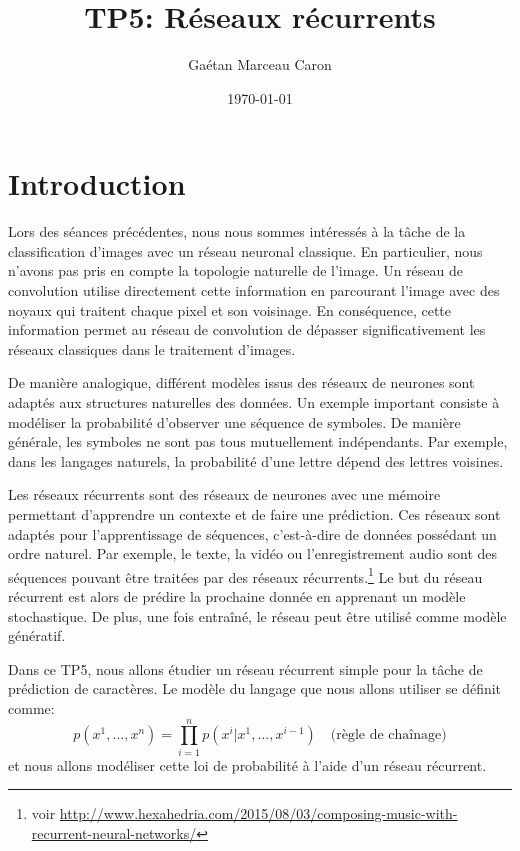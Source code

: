 \documentclass{article}
\title{TP5: Réseaux récurrents}
\author{Gaétan Marceau Caron}
\date{\today}
\begin{document}
\maketitle

\section{Introduction}
Lors des séances précédentes, nous nous sommes intéressés à la tâche de la classification d'images avec un réseau neuronal classique.
En particulier, nous n'avons pas pris en compte la topologie naturelle de l'image.
Un réseau de convolution utilise directement cette information en parcourant l'image avec des noyaux qui traitent chaque pixel et son voisinage.
En conséquence, cette information permet au réseau de convolution de dépasser significativement les réseaux classiques dans le traitement d'images.

De manière analogique, différent modèles issus des réseaux de neurones sont adaptés aux structures naturelles des données.
Un exemple important consiste à modéliser la probabilité d'observer une séquence de symboles.
De manière générale, les symboles ne sont pas tous mutuellement indépendants.
Par exemple, dans les langages naturels, la probabilité d'une lettre dépend des lettres voisines.

Les réseaux récurrents sont des réseaux de neurones avec une mémoire permettant d'apprendre un contexte et de faire une prédiction.
Ces réseaux sont adaptés pour l'apprentissage de séquences, c'est-à-dire de données possédant un ordre naturel.
Par exemple, le texte, la vidéo ou l'enregistrement audio sont des séquences pouvant être traitées par des réseaux récurrents.\footnote{voir \url{http://www.hexahedria.com/2015/08/03/composing-music-with-recurrent-neural-networks/}}
Le but du réseau récurrent est alors de prédire la prochaine donnée en apprenant un modèle stochastique.
De plus, une fois entraîné, le réseau peut être utilisé comme modèle génératif.

Dans ce TP5, nous allons étudier un réseau récurrent simple pour la tâche de prédiction de caractères.
Le modèle du langage que nous allons utiliser se définit comme:
\begin{equation}
p(x^1, \dots, x^n) = \prod_{i=1}^n p(x^i|x^1,\dots,x^{i-1}) \quad \mbox{(règle de chaînage)}
\end{equation}
et nous allons modéliser cette loi de probabilité à l'aide d'un réseau récurrent.
\end{document}
